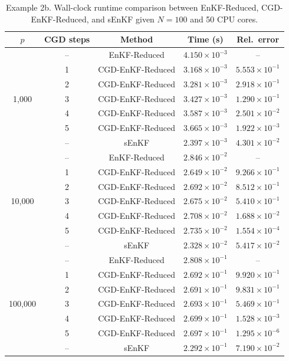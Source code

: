 \documentclass[11p]{elsarticle}
\numberwithin{equation}{section}
\begin{document}
\begin{table}[p]
\centering
\caption{Example 2b. Wall-clock runtime comparison between EnKF-Reduced, CGD-EnKF-Reduced, and sEnKF given $N = 100$ and 50 CPU cores.}
\begin{tabular}{ccccc}
\toprule
$p$ & CGD steps & Method & Time (s) & Rel.\ error \\
\midrule

\multirow{7}{*}{1,000}
& -- & EnKF-Reduced     & $4.150 \times 10^{-3}$ & -- \\
& 1  & CGD-EnKF-Reduced & $3.168\times 10^{-3}$ & $5.553\times 10^{-1}$ \\
& 2  & CGD-EnKF-Reduced & $3.281\times 10^{-3}$ & $2.918\times 10^{-1}$ \\
& 3  & CGD-EnKF-Reduced & $3.427\times 10^{-3}$ & $1.290\times 10^{-1}$ \\
& 4  & CGD-EnKF-Reduced & $3.587\times 10^{-3}$ & $2.501\times 10^{-2}$ \\
& 5  & CGD-EnKF-Reduced & $3.665\times 10^{-3}$ & $1.922\times 10^{-3}$ \\
& -- & sEnKF            & $2.397\times 10^{-3}$ & $4.301\times 10^{-2}$ \\

\midrule
\multirow{7}{*}{10,000}
& -- & EnKF-Reduced     & $2.846\times 10^{-2}$ & -- \\
& 1  & CGD-EnKF-Reduced & $2.649\times 10^{-2}$ & $9.266\times 10^{-1}$ \\
& 2  & CGD-EnKF-Reduced & $2.692\times 10^{-2}$ & $8.512\times 10^{-1}$ \\
& 3  & CGD-EnKF-Reduced & $2.675\times 10^{-2}$ & $5.410\times 10^{-1}$ \\
& 4  & CGD-EnKF-Reduced & $2.708\times 10^{-2}$ & $1.688\times 10^{-2}$ \\
& 5  & CGD-EnKF-Reduced & $2.735\times 10^{-2}$ & $1.554\times 10^{-4}$ \\
& -- & sEnKF            & $2.328\times 10^{-2}$ & $5.417\times 10^{-2}$ \\

\midrule
\multirow{7}{*}{100,000}
& -- & EnKF-Reduced     & $2.808\times 10^{-1}$ & -- \\
& 1  & CGD-EnKF-Reduced & $2.692\times 10^{-1}$ & $9.920\times 10^{-1}$ \\
& 2  & CGD-EnKF-Reduced & $2.691\times 10^{-1}$ & $9.831\times 10^{-1}$ \\
& 3  & CGD-EnKF-Reduced & $2.693\times 10^{-1}$ & $5.469\times 10^{-1}$ \\
& 4  & CGD-EnKF-Reduced & $2.699\times 10^{-1}$ & $1.528\times 10^{-3}$ \\
& 5  & CGD-EnKF-Reduced & $2.697\times 10^{-1}$ & $1.295\times 10^{-6}$ \\
& -- & sEnKF            & $2.292\times 10^{-1}$ & $7.190\times 10^{-2}$ \\


\end{tabular}
\end{table}
\end{document}
